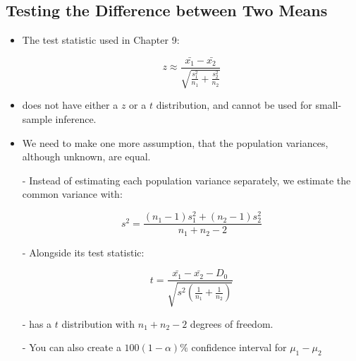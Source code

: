 \documentclass[12pt, letterpaper]{article}
\begin{document}
        \subsection{Testing the Difference between Two Means}
            \begin{itemize}
                \item The test statistic used in Chapter 9:
                \begin{center}
                    \begin{equation*}
                        z \approx \frac{\bar{x_1}-\bar{x_2}}{\sqrt{\frac{s_1^2}{n_1} + \frac{s_2^2}{n_2}}}
                    \end{equation*}
                \end{center}
                \item does not have either a $z$ or a $t$ distribution, and cannot be used for small-sample inference.
                \item We need to make one more assumption, that the population variances, although unknown, are equal.
                \item[-] Instead of estimating each population variance separately, we estimate the common variance with:
                \begin{center}
                    \begin{equation*}
                        s^2 = \frac{(n_1 - 1)s_1^2 + (n_2 - 1)s_2^2}{n_1 + n_2 - 2}
                    \end{equation*}
                \end{center}
                \item[-] Alongside its test statistic:
                \begin{center}
                    \begin{equation*}
                        t = \frac{\bar{x_1} - \bar{x_2} - D_0}{\sqrt{s^2\left(\frac{1}{n_1} + \frac{1}{n_2}\right)}}
                    \end{equation*}
                \end{center}
                \item[-] has a $t$ distribution with $n_1 + n_2 - 2$ degrees of freedom.
                \item[-] You can also create a $100(1 - \alpha)\%$ confidence interval for $\mu_1 - \mu_2$
                \begin{mdframed}[leftmargin=0.5cm, rightmargin=0.5cm]
                    \begin{equation*}

\end{equation*}
\end{mdframed}
\end{itemize}
\end{document}
